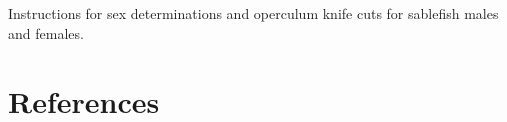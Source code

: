 \documentclass[12pt]{article}\usepackage[]{graphicx}\usepackage[]{color}
\begin{document}
\begin{appendices}
Instructions for sex determinations and operculum knife cuts for sablefish males and females.
\begin{center} \end{center}
\clearpage

\end{appendices}

\clearpage

\hypertarget{references}{%
\section{References}\label{references}}

\noindent \vspace{-2em} \setlength{\parindent}{-0.2in} \setlength{\leftskip}{0.2in} \setlength{\parskip}{8pt}
\end{document}
